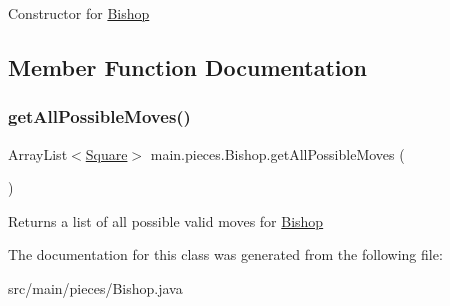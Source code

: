 Constructor for \hyperlink{classmain_1_1pieces_1_1_bishop}{Bishop} 

\subsection{Member Function Documentation}
\mbox{\label{classmain_1_1pieces_1_1_bishop_a0cd3729654e1172498f4215dd174ec5c}} 
\subsubsection{\texorpdfstring{get\+All\+Possible\+Moves()}{getAllPossibleMoves()}}
{\footnotesize\ttfamily Array\+List$<$\hyperlink{classmain_1_1_square}{Square}$>$ main.\+pieces.\+Bishop.\+get\+All\+Possible\+Moves (\begin{DoxyParamCaption}{ }\end{DoxyParamCaption})\hspace{0.3cm}{\ttfamily [inline]}}

Returns a list of all possible valid moves for \hyperlink{classmain_1_1pieces_1_1_bishop}{Bishop} 

The documentation for this class was generated from the following file\+:\begin{DoxyCompactItemize}
\item 
src/main/pieces/Bishop.\+java\end{DoxyCompactItemize}
